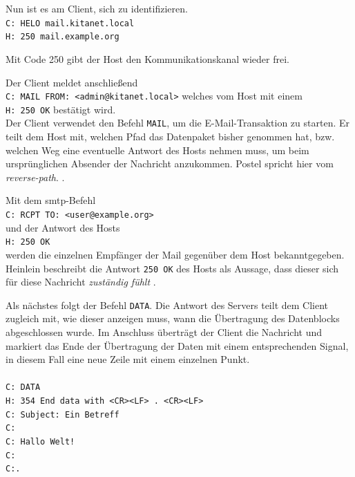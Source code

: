 Nun ist es am Client, sich zu identifizieren. \\
\verb+C: HELO mail.kitanet.local+ \\ 
\verb+H: 250 mail.example.org+

Mit Code 250  \citep[][35]{rfc821} gibt der Host den Kommunikationskanal wieder frei.

Der Client meldet anschließend \\
\verb+C: MAIL FROM: <admin@kitanet.local>+ welches vom Host mit einem \\
\verb+H: 250 OK+ bestätigt wird.\\
Der Client verwendet den Befehl \verb+MAIL+, um die E-Mail-Transaktion zu starten. Er teilt dem Host mit, welchen Pfad das Datenpaket bisher genommen hat, bzw. welchen Weg eine eventuelle Antwort des Hosts nehmen muss, um beim ursprünglichen Absender der Nachricht anzukommen. 
Postel spricht hier vom \textit{reverse-path}.  \citep[][20]{rfc821}.

Mit dem \ac{smtp}-Befehl\\
\verb+C: RCPT TO: <user@example.org>+ \\ 
und der Antwort des Hosts \\
\verb+H: 250 OK+\\
werden die einzelnen Empfänger der Mail gegenüber dem Host bekanntgegeben. Heinlein beschreibt die Antwort \verb+250 OK+ des Hosts als Aussage, dass dieser sich für diese Nachricht \textit{zuständig fühlt} \citep[vgl.][25]{Heinlein2004}.

Als nächstes folgt der Befehl \verb+DATA+. Die Antwort des Servers teilt dem Client zugleich mit, wie dieser anzeigen muss, wann die Übertragung des Datenblocks abgeschlossen wurde. Im Anschluss überträgt der Client die Nachricht und markiert das Ende der Übertragung der Daten mit einem entsprechenden Signal, in diesem Fall eine neue Zeile mit einem einzelnen Punkt.\\
\\
\verb+C: DATA+ \\
\verb+H: 354 End data with <CR><LF> . <CR><LF>+\\
\verb+C: Subject: Ein Betreff+ \\
\verb+C:+\\
\verb+C: Hallo Welt!+ \\
\verb+C:+\\ 
\verb+C:.+

